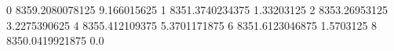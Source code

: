 0 8359.2080078125 9.166015625
1 8351.3740234375 1.33203125
2 8353.26953125 3.2275390625
4 8355.412109375 5.3701171875
6 8351.6123046875 1.5703125
8 8350.0419921875 0.0
